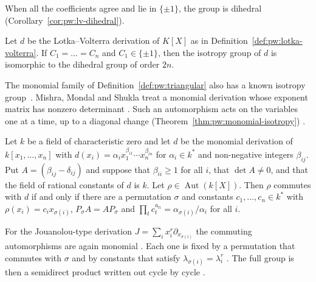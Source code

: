 When all the coefficients agree and lie in $\{\pm1\}$, the group is dihedral
(Corollary~\ref{cor:pw:lv-dihedral}).

\begin{corollary}\label{cor:pw:lv-dihedral}
Let $d$ be the Lotka--Volterra derivation of $K[X]$ as in
Definition~\ref{def:pw:lotka-volterra}. If $C_{1}=\dots=C_{n}$ and
$C_{1}\in\{\pm 1\}$, then the isotropy group of $d$ is isomorphic to the
dihedral group of order $2n$.
\end{corollary}

The monomial family of Definition~\ref{def:pw:triangular} also has a known
isotropy group~\cite[Theorem~3.1, p.~5]{MishraMondalShukla2026Monomial}. Mishra, Mondal and Shukla treat a monomial derivation whose
exponent matrix has nonzero determinant
\cite[Theorem~3.1, p.~5]{MishraMondalShukla2026Monomial}. Such an
automorphism acts on the variables one at a time, up to a diagonal change (Theorem~\ref{thm:pw:monomial-isotropy})
\cite[Theorem~3.1, p.~5]{MishraMondalShukla2026Monomial}.\begin{theorem}\label{thm:pw:monomial-isotropy}
Let $k$ be a field of characteristic zero and let $d$ be the monomial
derivation of $k[x_{1},\dots,x_{n}]$ with $d(x_{i})=\alpha_{i}x_{1}^{\beta_{i1}}\cdots x_{n}^{\beta_{in}}$
for $\alpha_{i}\in k^{*}$ and non-negative integers $\beta_{ij}$. Put
$A=(\beta_{ij}-\delta_{ij})$ and suppose that $\beta_{ii}\geq 1$ for all
$i$, that $\det A\neq 0$, and that the field of rational constants of $d$ is
$k$. Let $\rho\in\operatorname{Aut}(k[X])$. Then $\rho$ commutes with $d$ if
and only if there are a permutation $\sigma$ and constants $c_{1},\dots,c_{n}\in k^{*}$
with $\rho(x_{i})=c_{i}x_{\sigma(i)}$, $P_{\sigma}A=AP_{\sigma}$ and
$\prod_{t}c_{t}^{a_{ti}}=\alpha_{\sigma(i)}/\alpha_{i}$ for all $i$.
\end{theorem}

For the Jouanolou-type derivation
$J=\sum_{i}x_{i}^{r}\partial_{x_{\sigma(i)}}$ the commuting automorphisms are
again monomial \cite[Theorem~4.2, p.~11]{MishraMondalShukla2026Monomial}. Each
one is fixed by a permutation that commutes with $\sigma$ and by constants
that satisfy $\lambda_{\sigma(i)}=\lambda_{i}^{r}$ \cite[Theorem~4.2,
p.~11]{MishraMondalShukla2026Monomial}. The full group is then a semidirect
product written out cycle by cycle \cite[Theorem~4.6,
p.~14]{MishraMondalShukla2026Monomial}.

